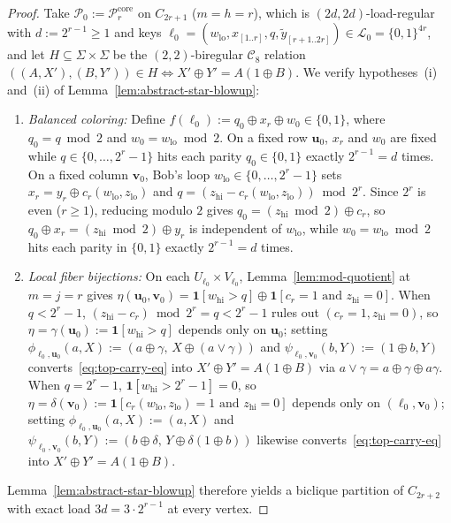 \documentclass[11pt,reqno]{amsart}
\theoremstyle{definition}
\theoremstyle{remark}
\newcommand{\ind}{\mathbf{1}}
\numberwithin{equation}{section}
\begin{document}
\begin{proof}
Take $\mathcal{P}_0 := \mathcal{P}_r^{\mathrm{core}}$ on $C_{2r+1}$ ($m = h = r$), which is $(2d, 2d)$-load-regular with $d := 2^{r-1} \ge 1$ and keys $\ell_0 = (w_{\mathrm{lo}}, x_{[1..r]}, q, \tilde{y}_{[r+1..2r]}) \in \mathcal{L}_0 = \{0, 1\}^{4r}$, and let $H \subseteq \Sigma \times \Sigma$ be the $(2, 2)$-biregular $\mathcal{C}_8$ relation $((A, X'), (B, Y')) \in H \iff X' \oplus Y' = A(1 \oplus B)$. We verify hypotheses~(i) and~(ii) of Lemma~\ref{lem:abstract-star-blowup}:
\begin{enumerate}[leftmargin=2em,label=\arabic*.]
  \item \emph{Balanced coloring:} Define $f(\ell_0) := q_0 \oplus x_r \oplus w_0 \in \{0, 1\}$, where $q_0 = q \bmod 2$ and $w_0 = w_{\mathrm{lo}} \bmod 2$. On a fixed row $\mathbf{u}_0$, $x_r$ and $w_0$ are fixed while $q \in \{0, \dots, 2^r - 1\}$ hits each parity $q_0 \in \{0, 1\}$ exactly $2^{r-1} = d$ times. On a fixed column $\mathbf{v}_0$, Bob's loop $w_{\mathrm{lo}} \in \{0, \dots, 2^r - 1\}$ sets $x_r = y_r \oplus c_r(w_{\mathrm{lo}}, z_{\mathrm{lo}})$ and $q = (z_{\mathrm{hi}} - c_r(w_{\mathrm{lo}}, z_{\mathrm{lo}})) \bmod 2^r$. Since $2^r$ is even ($r \ge 1$), reducing modulo $2$ gives $q_0 = (z_{\mathrm{hi}} \bmod 2) \oplus c_r$, so $q_0 \oplus x_r = (z_{\mathrm{hi}} \bmod 2) \oplus y_r$ is independent of $w_{\mathrm{lo}}$, while $w_0 = w_{\mathrm{lo}} \bmod 2$ hits each parity in $\{0, 1\}$ exactly $2^{r-1} = d$ times.
  \item \emph{Local fiber bijections:} On each $U_{\ell_0} \times V_{\ell_0}$, Lemma~\ref{lem:mod-quotient} at $m = j = r$ gives $\eta(\mathbf{u}_0, \mathbf{v}_0) = \ind[w_{\mathrm{hi}} > q] \oplus \ind[c_r = 1 \text{ and } z_{\mathrm{hi}} = 0]$. When $q < 2^r - 1$, $(z_{\mathrm{hi}} - c_r) \bmod 2^r = q < 2^r - 1$ rules out $(c_r = 1, z_{\mathrm{hi}} = 0)$, so $\eta = \gamma(\mathbf{u}_0) := \ind[w_{\mathrm{hi}} > q]$ depends only on $\mathbf{u}_0$; setting $\phi_{\ell_0, \mathbf{u}_0}(a, X) := (a \oplus \gamma,\, X \oplus (a \lor \gamma))$ and $\psi_{\ell_0, \mathbf{v}_0}(b, Y) := (1 \oplus b, Y)$ converts~\eqref{eq:top-carry-eq} into $X' \oplus Y' = A(1 \oplus B)$ via $a \lor \gamma = a \oplus \gamma \oplus a\gamma$. When $q = 2^r - 1$, $\ind[w_{\mathrm{hi}} > 2^r - 1] = 0$, so $\eta = \delta(\mathbf{v}_0) := \ind[c_r(w_{\mathrm{lo}}, z_{\mathrm{lo}}) = 1 \text{ and } z_{\mathrm{hi}} = 0]$ depends only on $(\ell_0, \mathbf{v}_0)$; setting $\phi_{\ell_0, \mathbf{u}_0}(a, X) := (a, X)$ and $\psi_{\ell_0, \mathbf{v}_0}(b, Y) := (b \oplus \delta,\, Y \oplus \delta(1 \oplus b))$ likewise converts~\eqref{eq:top-carry-eq} into $X' \oplus Y' = A(1 \oplus B)$.
\end{enumerate}
Lemma~\ref{lem:abstract-star-blowup} therefore yields a biclique partition of $C_{2r+2}$ with exact load $3d = 3 \cdot 2^{r-1}$ at every vertex.
\end{proof}
\end{document}
